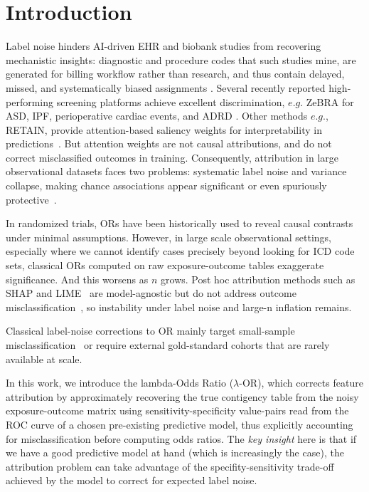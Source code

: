 \documentclass[pdflatex,sn-mathphys-num]{sn-jnl}%
\def\zcor{ZeBRA\xspace}
\newcommand{\SPOR}{\textrm{$\lambda$-OR}}
\theoremstyle{thmstyleone}%
\theoremstyle{thmstyletwo}%
\theoremstyle{thmstylethree}%
\begin{document}
\section{Introduction} 
Label noise hinders AI-driven EHR and biobank studies from recovering mechanistic insights: diagnostic and procedure codes that such studies  mine, are generated for billing workflow rather than research, and thus contain delayed, missed, and systematically biased assignments \cite{halpern2016electronic}.  Several recently reported  high-performing screening platforms  achieve excellent discrimination, $e.g.$ \zcor for ASD, IPF, perioperative cardiac events, and ADRD \cite{ASDzed,IPFzed,JAHAzed,ADRDzed}. Other methods $e.g.$, RETAIN, provide attention-based saliency weights for interpretability in predictions~\cite{choi2016retain}. But attention weights are not causal attributions, and do not correct misclassified outcomes in training. Consequently, attribution in large observational datasets faces two problems: systematic label noise and variance collapse, making chance associations appear significant or even spuriously protective~\cite{greenland1988sensitivity}.


In randomized trials, ORs have been historically used to  reveal causal contrasts under minimal assumptions. However, in large scale observational settings, especially where we cannot identify cases precisely beyond looking for ICD code sets,  classical ORs computed on raw exposure-outcome tables exaggerate significance. And this worsens as $n$ grows. Post hoc attribution methods such as SHAP and LIME~\cite{lundberg17shap} are model-agnostic but do not address outcome misclassification~\cite{slack2020fooling}, so instability under label noise and large-n inflation remains.

Classical label-noise corrections to OR mainly target small-sample misclassification~\cite{greenland1988sensitivity} or require external gold-standard cohorts that are rarely available at scale.

In this work, we introduce the lambda-Odds Ratio ($\SPOR$), which corrects feature  attribution by approximately recovering the true contigency table from   the noisy exposure-outcome matrix using sensitivity-specificity value-pairs read  from the ROC curve of a chosen pre-existing  predictive model, thus  explicitly accounting for misclassification before computing odds ratios. The \textit{key insight} here is that if we have a good predictive model at hand (which is increasingly the case), the attribution problem can take advantage of the specifity-sensitivity trade-off achieved by the model to correct for expected  label noise.
\end{document}
